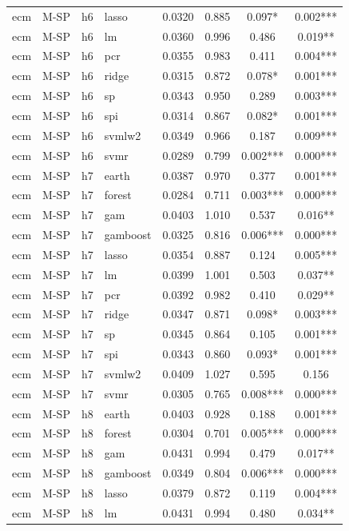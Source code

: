 \begin{ThreePartTable}
\begin{longtable}[t]{llclcccc}
ecm & M-SP & h6 & lasso & 0.0320 & 0.885 & 0.097* & 0.002***\\
ecm & M-SP & h6 & lm & 0.0360 & 0.996 & 0.486 & 0.019**\\
ecm & M-SP & h6 & pcr & 0.0355 & 0.983 & 0.411 & 0.004***\\
ecm & M-SP & h6 & ridge & 0.0315 & 0.872 & 0.078* & 0.001***\\
ecm & M-SP & h6 & sp & 0.0343 & 0.950 & 0.289 & 0.003***\\
ecm & M-SP & h6 & spi & 0.0314 & 0.867 & 0.082* & 0.001***\\
ecm & M-SP & h6 & svmlw2 & 0.0349 & 0.966 & 0.187 & 0.009***\\
ecm & M-SP & h6 & svmr & 0.0289 & 0.799 & 0.002*** & 0.000***\\
\addlinespace
ecm & M-SP & h7 & earth & 0.0387 & 0.970 & 0.377 & 0.001***\\
ecm & M-SP & h7 & forest & 0.0284 & 0.711 & 0.003*** & 0.000***\\
ecm & M-SP & h7 & gam & 0.0403 & 1.010 & 0.537 & 0.016**\\
ecm & M-SP & h7 & gamboost & 0.0325 & 0.816 & 0.006*** & 0.000***\\
ecm & M-SP & h7 & lasso & 0.0354 & 0.887 & 0.124 & 0.005***\\
ecm & M-SP & h7 & lm & 0.0399 & 1.001 & 0.503 & 0.037**\\
ecm & M-SP & h7 & pcr & 0.0392 & 0.982 & 0.410 & 0.029**\\
ecm & M-SP & h7 & ridge & 0.0347 & 0.871 & 0.098* & 0.003***\\
ecm & M-SP & h7 & sp & 0.0345 & 0.864 & 0.105 & 0.001***\\
ecm & M-SP & h7 & spi & 0.0343 & 0.860 & 0.093* & 0.001***\\
ecm & M-SP & h7 & svmlw2 & 0.0409 & 1.027 & 0.595 & 0.156\\
ecm & M-SP & h7 & svmr & 0.0305 & 0.765 & 0.008*** & 0.000***\\
\addlinespace
ecm & M-SP & h8 & earth & 0.0403 & 0.928 & 0.188 & 0.001***\\
ecm & M-SP & h8 & forest & 0.0304 & 0.701 & 0.005*** & 0.000***\\
ecm & M-SP & h8 & gam & 0.0431 & 0.994 & 0.479 & 0.017**\\
ecm & M-SP & h8 & gamboost & 0.0349 & 0.804 & 0.006*** & 0.000***\\
ecm & M-SP & h8 & lasso & 0.0379 & 0.872 & 0.119 & 0.004***\\
ecm & M-SP & h8 & lm & 0.0431 & 0.994 & 0.480 & 0.034**\\

\end{longtable}
\end{ThreePartTable}
